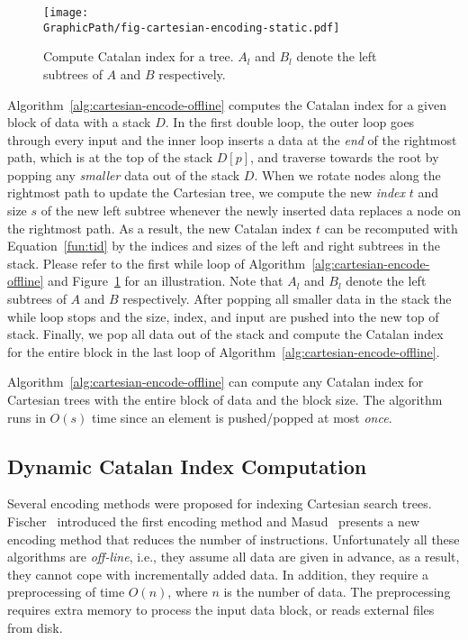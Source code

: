 

\begin{figure}[!thb]
  \centering
  \texttt{[image: \\GraphicPath/fig-cartesian-encoding-static.pdf]}
  \caption{Compute Catalan index for a tree.  $A_l$ and $B_l$ denote
    the left subtrees of $A$ and $B$ respectively.}
  \label{fig:fig-cartesian-encoding-static}
\end{figure}

Algorithm~\ref{alg:cartesian-encode-offline} computes the Catalan index
for a given block of data with a stack $D$.  In the first double loop,
the outer loop goes through every input and the inner loop inserts a
data at the {\em end} of the rightmost path, which is at the top of the
stack $D[p]$, and traverse towards the root by popping any {\em smaller}
data out of the stack $D$.  When we rotate nodes along the rightmost
path to update the Cartesian tree, we compute the new {\em index} $t$
and size $s$ of the new left subtree whenever the newly inserted data
replaces a node on the rightmost path.  As a result, the new Catalan
index $t$ can be recomputed with Equation~\ref{fun:tid} by the indices
and sizes of the left and right subtrees in the stack.  Please refer to
the first while loop of Algorithm~\ref{alg:cartesian-encode-offline} and
Figure~\ref{fig:fig-cartesian-encoding-static} for an illustration. Note
that $A_l$ and $B_l$ denote the left subtrees of $A$ and $B$
respectively.  After popping all smaller data in the stack the while
loop stops and the size, index, and input are pushed into the new top of
stack.  Finally, we pop all data out of the stack and compute the
Catalan index for the entire block in the last loop of
Algorithm~\ref{alg:cartesian-encode-offline}.

Algorithm~\ref{alg:cartesian-encode-offline} can compute any Catalan
index for Cartesian trees with the entire block of data and the block
size.  The algorithm runs in $O(s)$ time since an element is
pushed/popped at most {\em once}.



\subsection{Dynamic Catalan Index Computation}

Several encoding methods were proposed for indexing Cartesian search
trees.  Fischer~\cite{Fischer2006TheoreticalAP} introduced the first
encoding method and Masud~\cite{Hasan2010CacheOA} presents a new
encoding method that reduces the number of instructions. Unfortunately
all these algorithms are {\em off-line}, i.e., they assume all data are
given in advance, as a result, they cannot cope with incrementally added
data.  In addition, they require a preprocessing of time $O(n)$, where
$n$ is the number of data.  The preprocessing requires extra memory to
process the input data block, or reads external files from disk.

